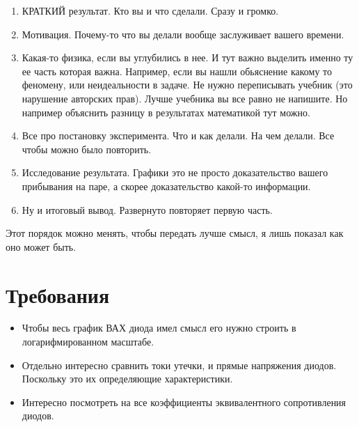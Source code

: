 \documentclass[a4paper,12pt]{article} %
\begin{document}
\begin{enumerate}
  \item КРАТКИЙ результат. Кто вы и что сделали. Сразу и громко.
  \item Мотивация. Почему-то что вы делали вообще заслуживает вашего времени.
  \item Какая-то физика, если вы углубились в нее. И тут важно выделить именно ту ее часть которая важна. Например, если вы нашли обьяснение какому то феномену, или неидеальности в задаче. Не нужно переписывать учебник (это нарушение авторских прав). Лучше учебника вы все равно не напишите. Но например объяснить разницу в результатах математикой тут можно.
  \item Все про постановку эксперимента. Что и как делали. На чем делали. Все чтобы можно было повторить.
  \item Исследование результата. Графики это не просто доказательство вашего прибывания на паре, а скорее доказательство какой-то информации.
  \item Ну и итоговый вывод. Развернуто повторяет первую часть.
\end{enumerate}
Этот порядок можно менять, чтобы передать лучше смысл, я лишь показал как оно может быть.

\section{Требования}
\begin{itemize}
  \item Чтобы весь график ВАХ диода имел смысл его нужно строить в логарифмированном масштабе.
  \item Отдельно интересно сравнить токи утечки, и прямые напряжения диодов. Поскольку это их определяющие характеристики.
  \item Интересно посмотреть на все коэффициенты эквивалентного сопротивления диодов.
\end{itemize}
\end{document}

